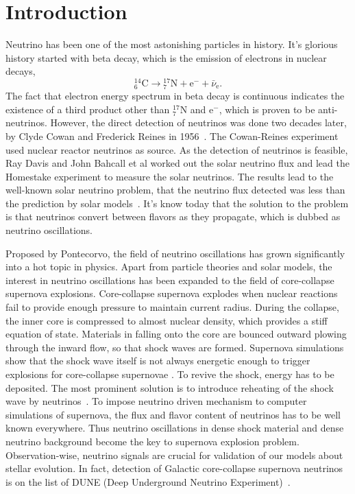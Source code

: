 \chapter{Introduction}
\label{introduction}

Neutrino has been one of the most astonishing particles in history. It's glorious history started with beta decay, which is the emission of electrons in nuclear decays,
\begin{equation*}
{}^{14}_{6} \mathrm C \to {}^{17}_{7}\mathrm N + \mathrm e^{-} + \bar\nu_{\mathrm e}.
\end{equation*}
The fact that electron energy spectrum in beta decay is continuous indicates the existence of a third product other than ${}^{17}_{7}\mathrm N$ and $\mathrm e^-$, which is proven to be anti-neutrinos. However, the direct detection of neutrinos was done two decades later, by Clyde Cowan and Frederick Reines in 1956~\cite{Cowan1956}. The Cowan-Reines experiment used nuclear reactor neutrinos as source. As the detection of neutrinos is feasible, Ray Davis and John Bahcall et al worked out the solar neutrino flux and lead the Homestake experiment to measure the solar neutrinos. The results lead to the well-known solar neutrino problem, that the neutrino flux detected was less than the prediction by solar models~\cite{Bahcall1973}. It's know today that the solution to the problem is that neutrinos convert between flavors as they propagate, which is dubbed as neutrino oscillations. 

Proposed by Pontecorvo, the field of neutrino oscillations has grown significantly into a hot topic in physics. Apart from particle theories and solar models, the interest in neutrino oscillations has been expanded to the field of core-collapse supernova explosions. Core-collapse supernova explodes when nuclear reactions fail to provide enough pressure to maintain current radius. During the collapse, the inner core is compressed to almost nuclear density, which provides a stiff equation of state. Materials in falling onto the core are bounced outward plowing through the inward flow, so that shock waves are formed. Supernova simulations show that the shock wave itself is not always energetic enough to trigger explosions for core-collapse supernovae \cite{Janka2016b}. To revive the shock, energy has to be deposited. The most prominent solution is to introduce reheating of the shock wave by neutrinos~\cite{Janka2016b}. To impose neutrino driven mechanism to computer simulations of supernova, the flux and flavor content of neutrinos has to be well known everywhere. Thus neutrino oscillations in dense shock material and dense neutrino background become the key to supernova explosion problem. Observation-wise, neutrino signals are crucial for validation of our models about stellar evolution. In fact, detection of Galactic core-collapse supernova neutrinos is on the list of DUNE (Deep Underground Neutrino Experiment)~\cite{Kemp2017}.

